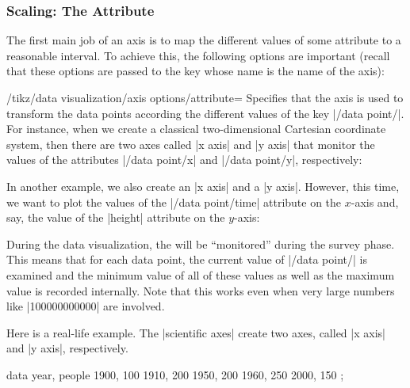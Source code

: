 \subsubsection{Scaling: The Attribute}

The first main job of an axis is to map the different values of some
attribute to a reasonable interval. To achieve this, the following
options are important (recall that these options are passed to the key
whose name is the name of the axis):

\begin{key}{/tikz/data visualization/axis options/attribute=}
  Specifies that the axis is used to transform the data points
  according the different values of the key
  |/data point/|. For instance, when we create a
  classical two-dimensional Cartesian coordinate system, then there
  are two axes called |x axis| and |y axis| that monitor the values of
  the attributes |/data point/x| and |/data point/y|, respectively:
\begin{codeexample}
\end{codeexample}
  In another example, we also create an |x axis| and a
  |y axis|. However, this time, we want to plot the values of the
  |/data point/time| attribute on the $x$-axis and, say, the value of
  the |height| attribute on the $y$-axis:
\begin{codeexample}
\end{codeexample}
  During the data visualization, the  will be
  ``monitored'' during the survey phase. This means that for each data
  point, the current value of |/data point/| is
  examined and the minimum value of all of these values as well as the
  maximum value is recorded internally. Note that this works even when
  very large numbers like |100000000000| are involved.

  Here is a real-life example. The |scientific axes| create two axes,
  called |x axis| and |y axis|, respectively.
\begin{codeexample}[]
\tikz \datavisualization [scientific axes,
                          x axis={attribute=people, length=2.5cm, ticks=few},
                          y axis={attribute=year},
                          visualize as scatter]
  data {
    year, people
    1900, 100
    1910, 200
    1950, 200
    1960, 250
    2000, 150
  };
\end{codeexample}
\end{key}

